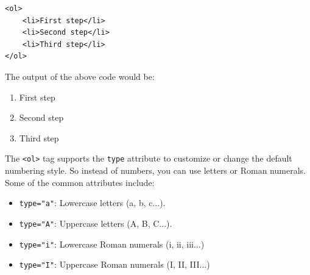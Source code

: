 \begin{verbatim}
<ol>
    <li>First step</li>
    <li>Second step</li>
    <li>Third step</li>
</ol>
\end{verbatim}

The output of the above code would be:

\begin{enumerate}
    \item First step
    \item Second step
    \item Third step
\end{enumerate}

The \verb|<ol>| tag supports the \verb|type| attribute to customize or change the default numbering style. 
So instead of numbers, you can use letters or Roman numerals. Some of the common attributes include:
\begin{itemize}
    \item \verb|type="a"|: Lowercase letters (a, b, c...).
    \item \verb|type="A"|: Uppercase letters (A, B, C...).
    \item \verb|type="i"|: Lowercase Roman numerals (i, ii, iii...)
    \item \verb|type="I"|: Uppercase Roman numerals (I, II, III...)
\end{itemize}

